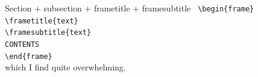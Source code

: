 \documentclass[aspectratio=169]{beamer}
\begin{document}
\begin{frame}[default]
\begin{columns}[t]
\begin{column}{0.48\textwidth}
    \begin{alertblock}{Section + subsection + frametitle + framesubtitle}
      \texttt{%
      \textbackslash begin\{frame\}\\%
      \textbackslash frametitle\{text\}\\
      \textbackslash framesubtitle\{text\}\\
      CONTENTS\\%
      \textbackslash end\{frame\}%
      }\\
      which I find quite overwhelming.
    \end{alertblock}
  \end{column}
\end{columns}

\end{frame}






\end{document}
